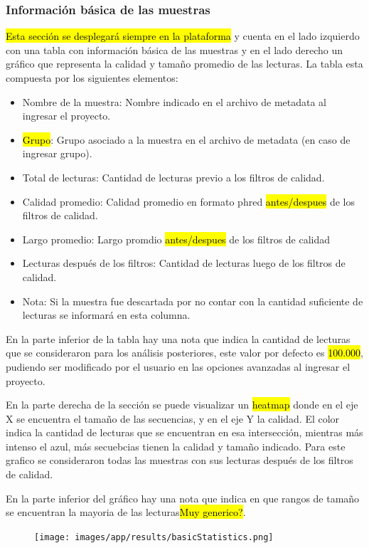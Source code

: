 \begin{itemize}
\subsubsection{Información básica de las muestras}
\hl{Esta sección se desplegará siempre en la plataforma} y cuenta en el lado izquierdo con una tabla con información básica de las muestras y en el lado derecho un gráfico que representa la calidad y tamaño promedio de las lecturas.
La tabla esta compuesta por los siguientes elementos:
\begin{itemize}
    \item Nombre de la muestra: Nombre indicado en el archivo de metadata al ingresar el proyecto.
    \item \hl{Grupo}: Grupo asociado a la muestra en el archivo de metadata (en caso de ingresar grupo).
    \item Total de lecturas: Cantidad de lecturas previo a los filtros de calidad.
    \item Calidad promedio: Calidad promedio en formato phred \hl{antes/despues} de los filtros de calidad.
    \item Largo promedio: Largo promdio \hl{antes/despues} de los filtros de calidad
    \item Lecturas después de los filtros: Cantidad de lecturas luego de los filtros de calidad.
    \item Nota: Si la muestra fue descartada por no contar con la cantidad suficiente de lecturas se informará en esta columna.
\end{itemize}
En la parte inferior de la tabla hay una nota que indica la cantidad de lecturas que se consideraron para los análisis posteriores, este valor por defecto es \hl{100.000}, pudiendo ser modificado por el usuario en las opciones avanzadas al ingresar el proyecto.

En la parte derecha de la sección se puede visualizar un \hl{heatmap} donde en el eje X se encuentra el tamaño de las secuencias, y en el eje Y la calidad. 
El color indica la cantidad de lecturas que se encuentran en esa intersección, mientras más intenso el azul, más secuebcias tienen la calidad y tamaño indicado.
Para este grafico se consideraron todas las muestras con sus lecturas después de los filtros de calidad.

En la parte inferior del gráfico hay una nota que indica en que rangos de tamaño se encuentran la mayoria de las lecturas\hl{Muy generico?}. 
\begin{figure}[H]
    \texttt{[image: images/app/results/basicStatistics.png]}


\end{figure}
\end{itemize}
